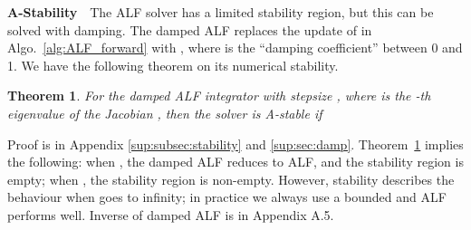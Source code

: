 \documentclass{article} \usepackage{iclr2021_conference,times}
\newtheorem{theorem}{Theorem}[section]
\begin{document}
\textbf{A-Stability}\ \ The ALF solver has a limited stability region, but this can be solved with damping. The damped ALF replaces the update of  in Algo.~\ref{alg:ALF_forward} with , where  is the ``damping coefficient'' between 0 and 1. We have the following theorem on its numerical stability.\begin{theorem}
\label{thm:stability}
For the damped ALF integrator with stepsize , where  is the -th eigenvalue of the Jacobian , then the solver is A-stable if 
\end{theorem}
Proof is in Appendix \ref{sup:subsec:stability} and \ref{sup:sec:damp}. Theorem~\ref{thm:stability} implies the following: when , the damped ALF reduces to ALF, and the stability region is empty; when , the stability region is non-empty. However, stability describes the behaviour when  goes to infinity; in practice we always use a bounded  and ALF performs well. Inverse of damped ALF is in Appendix A.5.

\vspace{-1mm}
\end{document}
